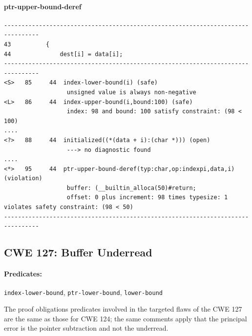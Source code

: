 \documentclass[11pt]{article}
\begin{document}
\paragraph{ptr-upper-bound-deref}
\begin{tiny}
\begin{verbatim}
--------------------------------------------------------------------------------
43          {
44              dest[i] = data[i];
--------------------------------------------------------------------------------
<S>   85     44  index-lower-bound(i) (safe)
                  unsigned value is always non-negative
<L>   86     44  index-upper-bound(i,bound:100) (safe)
                  index: 98 and bound: 100 satisfy constraint: (98 < 100)
....
<?>   88     44  initialized((*(data + i):(char *))) (open)
                  ---> no diagnostic found 
....
<*>   95     44  ptr-upper-bound-deref(typ:char,op:indexpi,data,i) (violation)
                  buffer: (__builtin_alloca(50)#return; 
                  offset: 0 plus increment: 98 times typesize: 1 violates safety constraint: (98 < 50)
--------------------------------------------------------------------------------                  
\end{verbatim}
\end{tiny}

\subsection{CWE 127: Buffer Underread}

\paragraph{Predicates:}  {\tt index-lower-bound}, {\tt ptr-lower-bound},
{\tt lower-bound}

The proof obligations predicates involved in the targeted flaws of the CWE 127 are the
same as those for CWE 124; the same comments apply that the principal error is the
pointer subtraction and not the underread.
\end{document}
